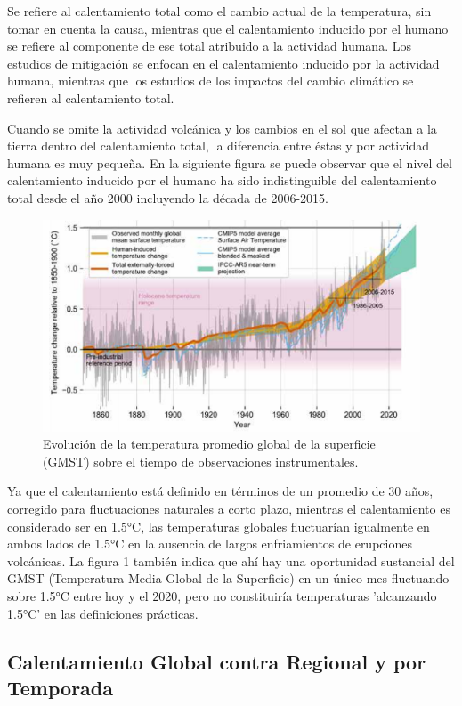 \documentclass{article}
\begin{document}
Se refiere al calentamiento total como el cambio actual de la temperatura, sin tomar en cuenta la causa, mientras que el calentamiento inducido por el humano se refiere al componente de ese total atribuido a la actividad humana. Los estudios de mitigación se enfocan en el calentamiento inducido por la actividad humana, mientras que los estudios de los impactos del cambio climático se refieren al calentamiento total.

Cuando se omite la actividad volcánica y los cambios en el sol que afectan a la tierra dentro del calentamiento total, la diferencia entre éstas y por actividad humana es muy pequeña.  En la siguiente figura se puede observar que el nivel del calentamiento inducido por el humano ha sido indistinguible del calentamiento total desde el año 2000 incluyendo la década de 2006-2015.
\begin{figure}[h]
    \centering
    \includegraphics[scale=0.8]{Figura1}
    \caption{Evolución de la temperatura promedio global de la superficie (GMST) sobre el tiempo de observaciones instrumentales.}
    \label{Figura 1}
\end{figure}

Ya que el calentamiento está definido en términos de un promedio de 30 años, corregido para fluctuaciones naturales a corto plazo, mientras el calentamiento es considerado ser en 1.5°C, las temperaturas globales fluctuarían igualmente en ambos lados de 1.5°C en la ausencia de  largos enfriamientos de erupciones volcánicas. La figura 1 también indica que ahí hay una oportunidad sustancial del GMST (Temperatura Media Global de la Superficie) en un único mes fluctuando sobre 1.5°C entre hoy y el 2020, pero no constituiría temperaturas 'alcanzando 1.5°C' en las definiciones prácticas. 

\subsection{Calentamiento Global contra Regional y por Temporada}
\end{document}

